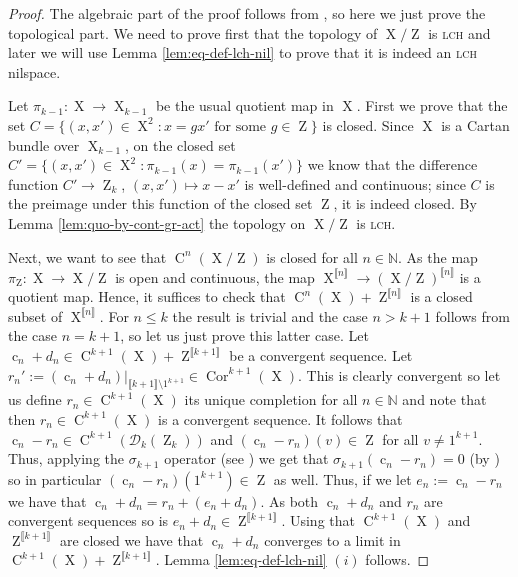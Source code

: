 \documentclass[a4paper,12pt,reqno]{amsart}
\theoremstyle{definition}
\def\to{\rightarrow}
\newcommand*{\db}[1]{\llbracket #1\rrbracket}
\newcommand{\mc}{\mathcal}
\newcommand{\mb}{\mathbb}
\DeclareMathOperator{\ab}{Z}
\DeclareMathOperator{\q}{c}
\DeclareMathOperator{\ns}{X}
\DeclareMathOperator{\cu}{C}
\DeclareMathOperator{\cor}{Cor}
\begin{document}
\begin{proof}
The algebraic part of the proof follows from \cite[Proposition A.19]{CGSS-p-hom}, so here we just prove the topological part. We need to prove first that the topology of $\ns/\ab$ is \textsc{lch} and later we will use Lemma \ref{lem:eq-def-lch-nil} to prove that it is indeed an \textsc{lch} nilspace.

Let $\pi_{k-1}:\ns\to \ns_{k-1}$ be the usual quotient map in $\ns$. First we prove that the set $C=\{(x,x')\in \ns^2: x=gx' \text{ for some } g\in \ab\}$ is closed. Since $\ns$ is a Cartan bundle over $\ns_{k-1}$, on the closed set $C'=\{(x,x')\in\ns^2:\pi_{k-1}(x)=\pi_{k-1}(x')\}$ we know that the difference function $C'\to \ab_k$, $(x,x')\mapsto x-x'$ is well-defined and continuous; since $C$ is the preimage under this function of the closed set $\ab$, it is indeed closed. By Lemma \ref{lem:quo-by-cont-gr-act} the topology on $\ns/\ab$ is \textsc{lch}.

Next, we want to see that $\cu^n(\ns/\ab)$ is closed for all $n\in \mb{N}$. As the map $\pi_{\ab}:\ns\to \ns/\ab$ is open and continuous, the map $\ns^{\db{n}}\to (\ns/\ab)^{\db{n}}$ is a quotient map. Hence, it suffices to check that $\cu^n(\ns)+\ab^{\db{n}}$ is a closed subset of $\ns^{\db{n}}$. For $n\le k$ the result is trivial and the case $n>k+1$ follows from the case $n=k+1$, so let us just prove this latter case. Let $\q_n+d_n\in \cu^{k+1}(\ns)+\ab^{\db{k+1}}$ be a convergent sequence. Let $r_n':=(\q_n+d_n)|_{\db{k+1}\setminus{1^{k+1}}}\in \cor^{k+1}(\ns)$. This is clearly convergent so let us define $r_n\in \cu^{k+1}(\ns)$ its unique completion for all $n\in \mb{N}$ and note that then $r_n\in \cu^{k+1}(\ns)$ is a convergent sequence. It follows that $\q_n-r_n\in \cu^{k+1}(\mc{D}_k(\ab_k))$ and $(\q_n-r_n)(v) \in \ab$ for all $v\not=1^{k+1}$. Thus, applying the $\sigma_{k+1}$ operator (see \cite[Definition 2.2.22]{Cand:Notes1}) we get that $\sigma_{k+1}(\q_n-r_n)=0$ (by \cite[Proposition 2.2.28 $(iii)$]{Cand:Notes1}) so in particular $(\q_n-r_n)(1^{k+1})\in \ab$ as well. Thus, if we let $e_n:=\q_n-r_n$ we have that $\q_n+d_n = r_n+(e_n+d_n)$. As both $\q_n+d_n$ and $r_n$ are convergent sequences so is $e_n+d_n\in \ab^{\db{k+1}}$. Using that $\cu^{k+1}(\ns)$ and $\ab^{\db{k+1}}$ are closed we have that $\q_n+d_n$ converges to a limit in $\cu^{k+1}(\ns)+\ab^{\db{k+1}}$. Lemma \ref{lem:eq-def-lch-nil} $(i)$ follows.


\end{proof}
\end{document}
